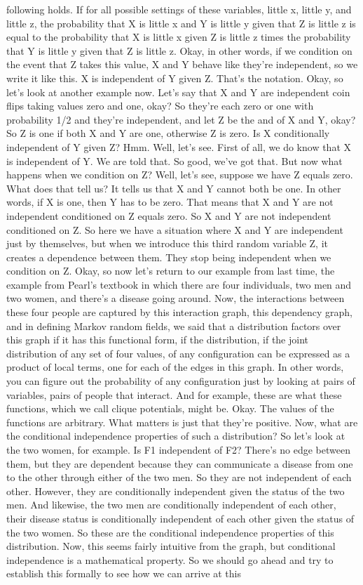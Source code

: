 \documentclass{article}
\begin{document}
\begin{flushleft}
following holds. If for all possible settings of these variables, little x, little y, and little z, the probability that X is little x and Y is little y given that Z is little z is equal to the probability that X is little x given Z is little z times the probability that Y is little y given that Z is little z. Okay, in other words, if we condition on the event that Z takes this value, X and Y behave like they're independent, so we write it like this. X is independent of Y given Z. That's the notation. Okay, so let's look at another example now. Let's say that X and Y are independent coin flips taking values zero and one, okay? So they're each zero or one with probability 1/2 and they're independent, and let Z be the and of X and Y, okay? So Z is one if both X and Y are one, otherwise Z is zero. Is X conditionally independent of Y given Z? Hmm. Well, let's see. First of all, we do know that X is independent of Y. We are told that. So good, we've got that. But now what happens when we condition on Z? Well, let's see, suppose we have Z equals zero. What does that tell us? It tells us that X and Y cannot both be one. In other words, if X is one, then Y has to be zero. That means that X and Y are not independent conditioned on Z equals zero. So X and Y are not independent conditioned on Z. So here we have a situation where X and Y are independent just by themselves, but when we introduce this third random variable Z, it creates a dependence between them. They stop being independent when we condition on Z. Okay, so now let's return to our example from last time, the example from Pearl's textbook in which there are four individuals, two men and two women, and there's a disease going around. Now, the interactions between these four people are captured by this interaction graph, this dependency graph, and in defining Markov random fields, we said that a distribution factors over this graph if it has this functional form, if the distribution, if the joint distribution of any set of four values, of any configuration can be expressed as a product of local terms, one for each of the edges in this graph. In other words, you can figure out the probability of any configuration just by looking at pairs of variables, pairs of people that interact. And for example, these are what these functions, which we call clique potentials, might be. Okay. The values of the functions are arbitrary. What matters is just that they're positive. Now, what are the conditional independence properties of such a distribution? So let's look at the two women, for example. Is F1 independent of F2? There's no edge between them, but they are dependent because they can communicate a disease from one to the other through either of the two men. So they are not independent of each other. However, they are conditionally independent given the status of the two men. And likewise, the two men are conditionally independent of each other, their disease status is conditionally independent of each other given the status of the two women. So these are the conditional independence properties of this distribution. Now, this seems fairly intuitive from the graph, but conditional independence is a mathematical property. So we should go ahead and try to establish this formally to see how we can arrive at this 
\end{flushleft}
\end{document}
